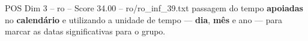 \begin{textsample}{POS Dim 3 – ro – Score 34.00 – ro/ro\_inf\_39.txt}
passagem do tempo \textbf{apoiadas} no \textbf{calendário} e utilizando a unidade de tempo — \textbf{dia}, \textbf{mês} e ano — para marcar as datas significativas para o grupo.

\end{textsample}
